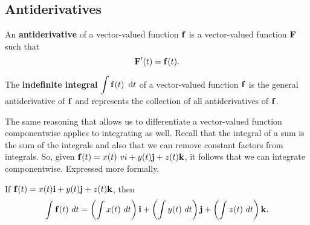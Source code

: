 \begin{comment}
 In general, the polygonal path determined by $n \ge 3$ noncollinear points in 
$\bbR^n$ can be used to define
 the Bézier curve recursively by a process called \emph{repeated linear 
interpolation}. This curve will be a
 vector-valued function whose components are polynomials of degree $n-1$, and 
its formula is given by
 \emph{de Casteljau's algorithm}.\footnote{See pp. 27-30 in \cite{far}.} In the 
exercises, the reader will be given the
 algorithm for the case of $n = 4$ points and asked to write the explicit 
formula for the Bézier curve for the four
 points shown in Figure \ref{fig:bezier3}.
 
 \begin{figure}[h]
  \begin{center}
   
  \end{center}
 \caption[]{\quad Bézier curve approximation for four points}
 \label{fig:bezier3}
 \end{figure}
\end{exa}

\todoin{Improve Bezier}
\end{comment}
\subsection{Antiderivatives}


\begin{definition} An
\textbf{antiderivative}
of a vector-valued function $\mathbf{ f}$ is a vector-valued function $\mathbf{ F}$
such that
\[\mathbf{ F}'(t) = \mathbf{ f}(t).\]

The \textbf{indefinite integral} $\dint \vector{f}(t) \dt$ of a vector-valued
function $\mathbf{ f}$ is the general antiderivative of $\mathbf{ f}$ and represents the
collection of all antiderivatives of $\mathbf{ f}$. \end{definition} 


The same reasoning that allows us to differentiate a vector-valued
function componentwise applies to integrating as well. Recall that the
integral of a sum is the sum of the integrals and also that we can
remove constant factors from integrals. So, given ${\mathbf{ f}(t) = x(t)\ vi
+ y(t) \mathbf{ j} + z(t) \mathbf{ k}}$, it follows that we can integrate
componentwise. Expressed more formally,

If $\mathbf{ f}(t) = x(t) \mathbf{ i} + y(t) \mathbf{ j} + z(t) \mathbf{ k}$, then
\[\dint \vector{f}(t) \ dt = \left(\dint x(t) \ dt\right) \vector{i} + \left( \dint
y(t) \ dt \right) \vector{j} + \left(\dint z(t) \ dt\right) \vector{k}.\]

